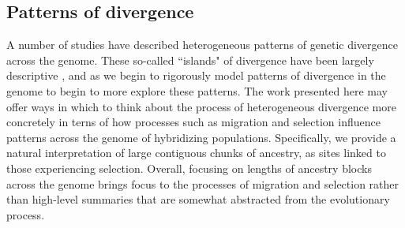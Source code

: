 \documentclass[11pt,letterpaper]{article}
\newcommand{\alisa}[1]{{\em \color{red} #1}}
\newcommand{\plr}[1]{{\em \color{blue} #1}}
\begin{document}




\subsection*{Patterns of divergence}  
A number of studies have described heterogeneous patterns of genetic divergence across the genome. These so-called ``islands" of divergence \citep{Turner2005,Nosil2009} have been largely descriptive \citep{Cruickshank2014,Noor2009}, and as we begin to rigorously model patterns of divergence in the genome to begin to more  explore these patterns. The work presented here may offer ways in which to think about the process of heterogeneous divergence more concretely in terns of how processes such as migration and selection influence patterns across the genome of hybridizing populations. Specifically, we provide a natural interpretation of large contiguous chunks of ancestry, as sites linked to those experiencing selection.   
Overall, focusing on lengths of ancestry blocks across the genome brings focus to the processes of migration and selection rather than high-level summaries that are somewhat abstracted from the evolutionary process. 



\end{document}
